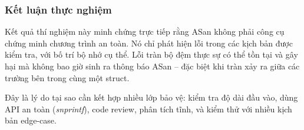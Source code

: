 \subsubsection{Kết luận thực nghiệm}

Kết quả thí nghiệm này minh chứng trực tiếp rằng ASan không phải công
cụ chứng minh chương trình an toàn. Nó chỉ phát hiện lỗi trong các kịch bản
được kiểm tra, với bố trí bộ nhớ cụ thể. Lỗi tràn bộ đệm thực sự có thể tồn
tại và gây hại mà không bao giờ sinh ra thông báo ASan -- đặc biệt khi tràn
xảy ra giữa các trường bên trong cùng một struct.

Đây là lý do tại sao cần kết hợp nhiều lớp bảo vệ: kiểm tra độ dài đầu vào,
dùng API an toàn (\textit{snprintf}), code review, phân tích tĩnh, và kiểm
thử với nhiều kịch bản edge-case.
